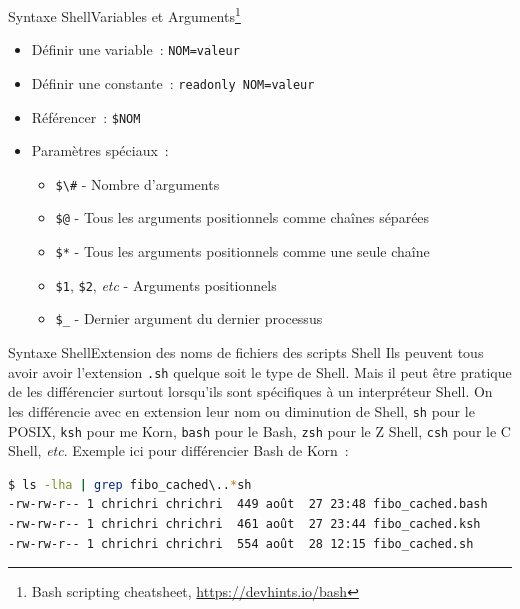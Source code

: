 \documentclass{beamer}
\begin{document}
    \begin{frame}{Syntaxe Shell}{Variables et Arguments\footnote{\label{devhint-bash}Bash scripting cheatsheet, \url{https://devhints.io/bash}}}
        \bigbreak
        \begin{itemize}
            \item Définir une variable~: \lstinline{NOM=valeur}
            \item Définir une constante~: \lstinline{readonly NOM=valeur}
            \item Référencer~: \lstinline{$NOM}
            \item Paramètres spéciaux~:
            \begin{itemize}
                \item \lstinline{$\#} - Nombre d'arguments
                \item \lstinline{$@} - Tous les arguments positionnels comme chaînes séparées
                \item \lstinline{$*} - Tous les arguments positionnels comme une seule chaîne
                \item \lstinline{$1}, \lstinline{$2}, \textit{etc} - Arguments positionnels
                \item \lstinline{$_} - Dernier argument du dernier processus
            \end{itemize}
        \end{itemize}
    \end{frame}

    \begin{frame}[fragile]{Syntaxe Shell}{Extension des noms de fichiers des scripts Shell}
        Ils peuvent tous avoir avoir l'extension \lstinline{.sh} quelque soit le type de Shell.
        \bigbreak
        Mais il peut être pratique de les différencier surtout lorsqu'ils sont spécifiques à un interpréteur Shell.
        On les différencie avec en extension leur nom ou diminution de Shell, \lstinline{sh} pour le POSIX, \lstinline{ksh} pour me Korn, \lstinline{bash} pour le Bash, \lstinline{zsh} pour le Z Shell, \lstinline{csh} pour le C Shell, \textit{etc}.
        \bigbreak
        Exemple ici pour différencier Bash de Korn~:
        \begin{lstlisting}[language=bash]
$ ls -lha | grep fibo_cached\..*sh
-rw-rw-r-- 1 chrichri chrichri  449 août  27 23:48 fibo_cached.bash
-rw-rw-r-- 1 chrichri chrichri  461 août  27 23:44 fibo_cached.ksh
-rw-rw-r-- 1 chrichri chrichri  554 août  28 12:15 fibo_cached.sh
        \end{lstlisting}
    \end{frame}
\end{document}
